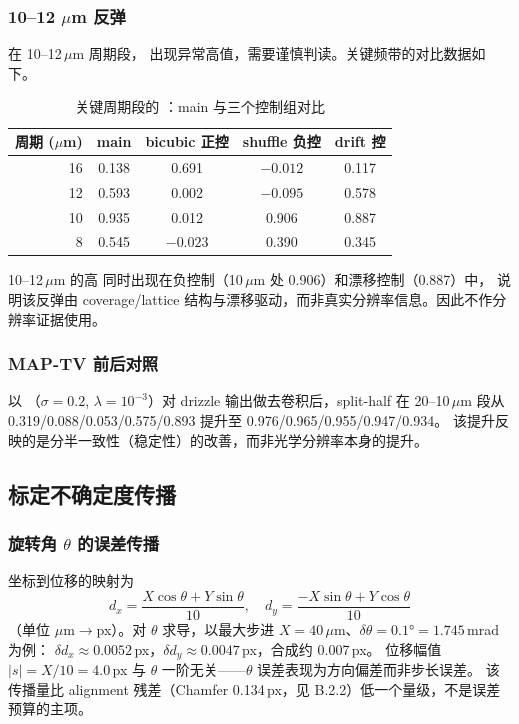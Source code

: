 \subsubsection{10--12 \texorpdfstring{\(\mu\)}{u}m 反弹}

在 10--12\,\(\mu\)m 周期段， 出现异常高值，需要谨慎判读。关键频带的对比数据如下。

\begin{table}[ht]
  \centering
  \caption{关键周期段的 ：main 与三个控制组对比}
  \label{tab:frc-band}
  \small
  \begin{tabular}{rcccc}
    \toprule
    周期 (\(\mu\)m) & main & bicubic 正控 & shuffle 负控 & drift 控 \\
    \midrule
    16 & 0.138 & 0.691 & \(-0.012\) & 0.117 \\
    12 & 0.593 & 0.002 & \(-0.095\) & 0.578 \\
    10 & 0.935 & 0.012 & 0.906 & 0.887 \\
    8  & 0.545 & \(-0.023\) & 0.390 & 0.345 \\
    \bottomrule
  \end{tabular}
\end{table}

10--12\,\(\mu\)m 的高  同时出现在负控制（10\,\(\mu\)m 处 0.906）和漂移控制（0.887）中，
说明该反弹由 coverage/lattice 结构与漂移驱动，而非真实分辨率信息。因此不作分辨率证据使用。

\subsubsection{MAP-TV 前后对照}

以 （\(\sigma = 0.2\), \(\lambda = 10^{-3}\)）对 drizzle 输出做去卷积后，split-half  在 20--10\,\(\mu\)m 段从 0.319/0.088/0.053/0.575/0.893 提升至 0.976/0.965/0.955/0.947/0.934。
该提升反映的是分半一致性（稳定性）的改善，而非光学分辨率本身的提升。

\subsection{标定不确定度传播}

\subsubsection{旋转角 \texorpdfstring{\(\theta\)}{theta} 的误差传播}

坐标到位移的映射为
\[
  d_x = \frac{X\cos\theta + Y\sin\theta}{10}, \quad d_y = \frac{-X\sin\theta + Y\cos\theta}{10}
\]
（单位 \(\mu\)m\(\rightarrow\)px）。对 \(\theta\) 求导，以最大步进 \(X = 40\)\,\(\mu\)m、\(\delta\theta = 0.1° = 1.745\)\,mrad 为例：
\(\delta d_x \approx 0.0052\)\,px，\(\delta d_y \approx 0.0047\)\,px，合成约 0.007\,px。
位移幅值 \(|s| = X/10 = 4.0\)\,px 与 \(\theta\) 一阶无关——\(\theta\) 误差表现为方向偏差而非步长误差。
该传播量比 alignment 残差（Chamfer 0.134\,px，见 B.2.2）低一个量级，不是误差预算的主项。

